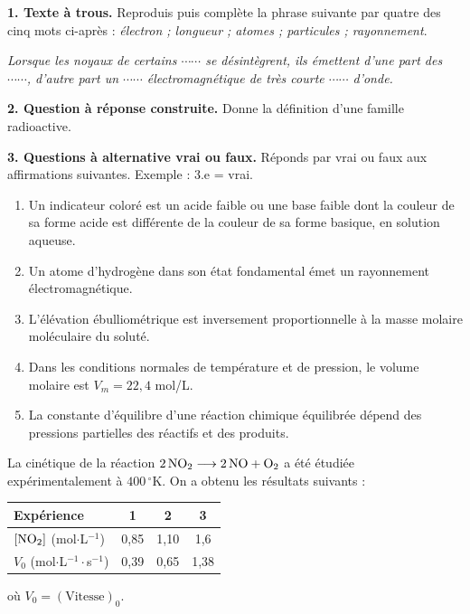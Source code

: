 \documentclass[11pt]{article}
\begin{document}



\noindent\textbf{1. Texte à trous.} Reproduis puis complète la phrase suivante par quatre des cinq mots ci-après : \textit{électron ; longueur ; atomes ; particules ; rayonnement}.

\textit{Lorsque les noyaux de certains $\cdots\cdots$ se désintègrent, ils émettent d'une part des $\cdots\cdots$, d'autre part un $\cdots\cdots$ électromagnétique de très courte $\cdots\cdots$ d'onde.}

\medskip
\noindent\textbf{2. Question à réponse construite.} Donne la définition d'une famille radioactive.

\medskip
\noindent\textbf{3. Questions à alternative vrai ou faux.} Réponds par vrai ou faux aux affirmations suivantes. Exemple : 3.e = vrai.
\begin{enumerate}[label=3.\alph*.]
  \item Un indicateur coloré est un acide faible ou une base faible dont la couleur de sa forme acide est différente de la couleur de sa forme basique, en solution aqueuse.
  \item Un atome d'hydrogène dans son état fondamental émet un rayonnement électromagnétique.
  \item L'élévation ébulliométrique est inversement proportionnelle à la masse molaire moléculaire du soluté.
  \item Dans les conditions normales de température et de pression, le volume molaire est $V_m = 22{,}4$ mol/L.
  \item La constante d'équilibre d'une réaction chimique équilibrée dépend des pressions partielles des réactifs et des produits.
\end{enumerate}

La cinétique de la réaction $\mathrm{2\,NO_2 \longrightarrow 2\,NO + O_2}$ a été étudiée expérimentalement à $400\,^\circ$K. On a obtenu les résultats suivants :

\begin{center}\renewcommand{\arraystretch}{1.3}
\begin{tabular}{|l|c|c|c|}
\hline
Expérience & 1 & 2 & 3 \\
\hline
$[\mathrm{NO_2}]$ (mol$\cdot$L$^{-1}$) & 0,85 & 1,10 & 1,6 \\
\hline
$V_0$ (mol$\cdot$L$^{-1}\cdot$s$^{-1}$) & 0,39 & 0,65 & 1,38 \\
\hline
\end{tabular}
\end{center}
\noindent où $V_0 = (\text{Vitesse})_0$.
\end{document}
